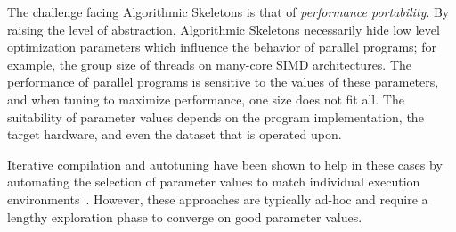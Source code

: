   The challenge facing Algorithmic Skeletons is that of \textit{performance portability}. By raising the level of abstraction, Algorithmic Skeletons necessarily hide low level optimization parameters which influence the behavior of parallel programs; for example, the group size of threads on many-core SIMD architectures. The performance of parallel programs is sensitive to the values of these parameters, and when tuning to maximize performance, one size does not fit all. The suitability of parameter values depends on the program implementation, the target hardware, and even the dataset that is operated upon.

  Iterative compilation and autotuning have been shown to help in these cases by automating the selection of parameter values to match individual execution environments~\cite{%
  Bodin1998,%
  Chen,%
  Choi2010%
  }. However, these approaches are typically ad-hoc and require a lengthy exploration phase to converge on good parameter values.

